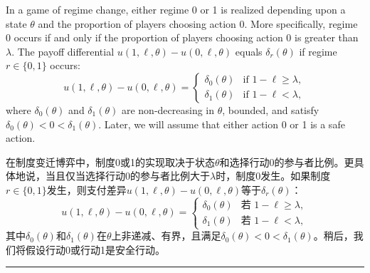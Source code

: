\documentclass[12pt,a4paper]{article}
\newenvironment{original}
  {\par\medskip\noindent\color{black}\ignorespaces}
  {\par\medskip}
\newenvironment{translation}
  {\par\noindent\color{darkblue}\ignorespaces}
  {\par\medskip\noindent\hrule\par\medskip}
\theoremstyle{definition}
\theoremstyle{remark}
\begin{document}
\begin{original}
In a game of regime change, either regime 0 or 1 is realized depending upon a state $\theta$ and the proportion of players choosing action 0. More specifically, regime 0 occurs if and only if the proportion of players choosing action 0 is greater than $\lambda$. The payoff differential $u(1, \ell, \theta) - u(0, \ell, \theta)$ equals $\delta_r(\theta)$ if regime $r \in \{0, 1\}$ occurs:
\[
u(1, \ell, \theta) - u(0, \ell, \theta) =
\begin{cases}
\delta_0(\theta) & \text{if } 1 - \ell \ge \lambda,\\[2pt]
\delta_1(\theta) & \text{if } 1 - \ell < \lambda,
\end{cases}
\]
where $\delta_0(\theta)$ and $\delta_1(\theta)$ are non-decreasing in $\theta$, bounded, and satisfy $\delta_0(\theta) < 0 < \delta_1(\theta)$. Later, we will assume that either action 0 or 1 is a safe action.
\end{original}
\begin{translation}
在制度变迁博弈中，制度0或1的实现取决于状态$\theta$和选择行动0的参与者比例。更具体地说，当且仅当选择行动0的参与者比例大于$\lambda$时，制度0发生。如果制度$r \in \{0, 1\}$发生，则支付差异$u(1, \ell, \theta) - u(0, \ell, \theta)$等于$\delta_r(\theta)$：
\[
u(1, \ell, \theta) - u(0, \ell, \theta) =
\begin{cases}
\delta_0(\theta) & \text{若 } 1 - \ell \ge \lambda,\\[2pt]
\delta_1(\theta) & \text{若 } 1 - \ell < \lambda,
\end{cases}
\]
其中$\delta_0(\theta)$和$\delta_1(\theta)$在$\theta$上非递减、有界，且满足$\delta_0(\theta) < 0 < \delta_1(\theta)$。稍后，我们将假设行动0或行动1是安全行动。
\end{translation}
\end{document}

